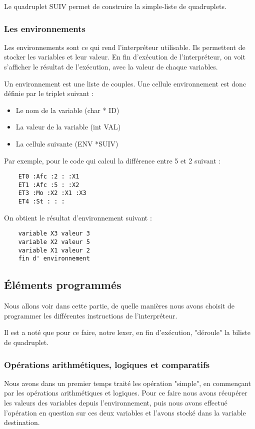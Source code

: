 \documentclass{article}
\begin{document}
Le quadruplet SUIV permet de construire la simple-liste de quadruplets.

\subsubsection{Les environnements}

Les environnements sont ce qui rend l’interpréteur utilisable. Ils permettent de stocker les variables et leur valeur.
En fin d’exécution de l'interpréteur, on voit s'afficher le résultat de l’exécution, avec la valeur de chaque variables.

Un environnement est une liste de couples. Une cellule environnement est donc définie par le triplet suivant :

\begin{itemize}
\item Le nom de la variable (char * ID)
\item La valeur de la variable (int VAL)
\item La cellule suivante (ENV *SUIV)
\end{itemize}

\bigbreak
Par exemple, pour le code qui calcul la différence entre 5 et 2 suivant :
\begin{lstlisting}
    ET0 :Afc :2 : :X1
    ET1 :Afc :5 : :X2
    ET3 :Mo :X2 :X1 :X3
    ET4 :St : : :
\end{lstlisting}

On obtient le résultat d'environnement suivant :

\begin{lstlisting}
    variable X3 valeur 3
    variable X2 valeur 5
    variable X1 valeur 2
    fin d' environnement
\end{lstlisting}


\subsection{Éléments programmés}

Nous allons voir dans cette partie, de quelle manières nous avons choisit de programmer les différentes instructions de l'interpréteur.

Il est a noté que pour ce faire, notre lexer, en fin d'exécution, "déroule" la biliste de quadruplet.
\subsubsection{Opérations arithmétiques, logiques et comparatifs}
Nous avons dans un premier temps traité les opération "simple", en commençant par les opérations arithmétiques et logiques.
Pour ce faire nous avons récupérer les valeurs des variables depuis l'environnement, puis nous avons effectué l'opération en question sur ces deux variables et l'avons stocké dans la variable destination.
\end{document}
